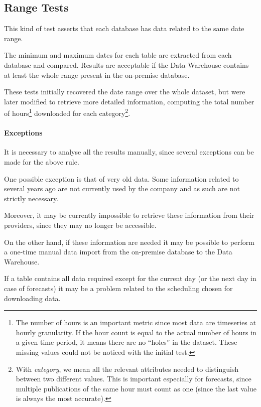 \subsection{Range Tests}
    This kind of test asserts that each database has data related to the same date range.

    The minimum and maximum dates for each table are extracted from each database and compared.
    Results are acceptable if the Data Warehouse contains at least the whole range present in the on-premise database.
    
    These tests initially recovered the date range over the whole dataset, but were later modified to retrieve more detailed information, computing the total number of hours\footnote{
        The number of hours is an important metric since most data are timeseries at hourly granularity.
        If the hour count is equal to the actual number of hours in a given time period, it means there are no ``holes'' in the dataset.
        These missing values could not be noticed with the initial test.
    } downloaded for each category\footnote{
        With \textit{category}, we mean all the relevant attributes needed to distinguish between two different values.
        This is important especially for forecasts, since multiple publications of the same hour must count as one (since the last value is always the most accurate).
    }.
    
    \paragraph{Exceptions}
        It is necessary to analyse all the results manually, since several exceptions can be made for the above rule.
    
            One possible exception is that of very old data.
            Some information related to several years ago are not currently used by the company and as such are not strictly necessary.
            
            Moreover, it may be currently impossible to retrieve these information from their providers, since they may no longer be accessible.
            
            On the other hand, if these information are needed it may be possible to perform a one-time manual data import from the on-premise database to the Data Warehouse.
            
            If a table contains all data required except for the current day (or the next day in case of forecasts) it may be a problem related to the scheduling chosen for downloading data.
            
